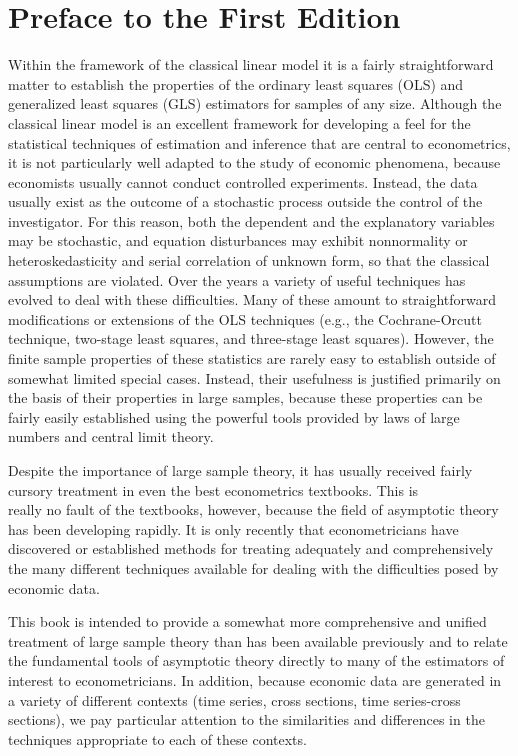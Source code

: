 \documentclass[10pt]{article}
\begin{document}
\section*{Preface to the First Edition}
Within the framework of the classical linear model it is a fairly straightforward matter to establish the properties of the ordinary least squares (OLS) and generalized least squares (GLS) estimators for samples of any size. Although the classical linear model is an excellent framework for developing a feel for the statistical techniques of estimation and inference that are central to econometrics, it is not particularly well adapted to the study of economic phenomena, because economists usually cannot conduct controlled experiments. Instead, the data usually exist as the outcome of a stochastic process outside the control of the investigator. For this reason, both the dependent and the explanatory variables may be stochastic, and equation disturbances may exhibit nonnormality or heteroskedasticity and serial correlation of unknown form, so that the classical assumptions are violated. Over the years a variety of useful techniques has evolved to deal with these difficulties. Many of these amount to straightforward modifications or extensions of the OLS techniques (e.g., the Cochrane-Orcutt technique, two-stage least squares, and three-stage least squares). However, the finite sample properties of these statistics are rarely easy to establish outside of somewhat limited special cases. Instead, their usefulness is justified primarily on the basis of their properties in large samples, because these properties can be fairly easily established using the powerful tools provided by laws of large numbers and central limit theory.

Despite the importance of large sample theory, it has usually received fairly cursory treatment in even the best econometrics textbooks. This is\\
really no fault of the textbooks, however, because the field of asymptotic theory has been developing rapidly. It is only recently that econometricians have discovered or established methods for treating adequately and comprehensively the many different techniques available for dealing with the difficulties posed by economic data.

This book is intended to provide a somewhat more comprehensive and unified treatment of large sample theory than has been available previously and to relate the fundamental tools of asymptotic theory directly to many of the estimators of interest to econometricians. In addition, because economic data are generated in a variety of different contexts (time series, cross sections, time series-cross sections), we pay particular attention to the similarities and differences in the techniques appropriate to each of these contexts.
\end{document}
